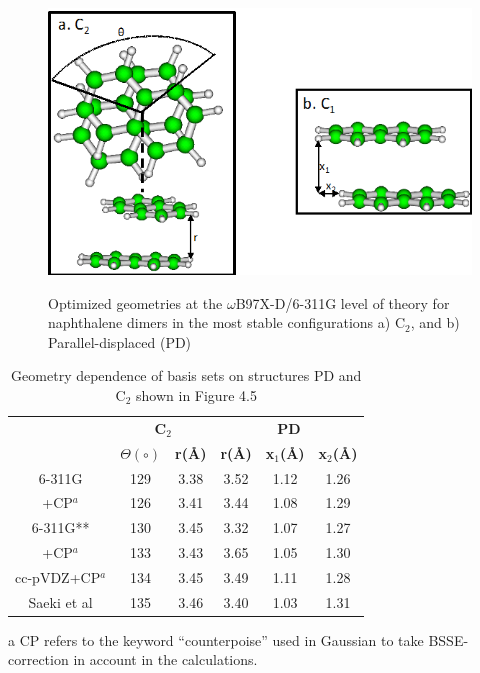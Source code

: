 \begin{figure}[h]
	\centering
	\includegraphics[scale=0.5]{image/napthalene-dimer}     \label{fig5d}
	\caption[Optimized geometries for naphthalene dimers]{Optimized geometries at the $\omega$B97X-D/6-311G level of theory for naphthalene dimers in the most stable configurations a) C$_{2}$, and b) Parallel-displaced (PD)}  
\end{figure}


\begin{table}[H]
	\caption{Geometry dependence of basis sets on structures PD and C$_{2}$ shown in Figure 4.5}
	\begin{center}
		\begin{threeparttable}[b]
		\begin{tabular}{c c c c c c}
			\toprule
			 & \multicolumn{2}{p{4cm}}{\centering \textbf{C$_{2}$}} & \multicolumn{3}{p{6cm}}{\centering \textbf{PD}}\\
			  & \textbf{$\Theta(\circ)$} & \textbf{r(\AA)} & \textbf{r(\AA)} & \textbf{x$_{1}$(\AA)} & \textbf{x$_{2}$(\AA)}\\
			  \midrule
			  6-311G & 129 & 3.38 & 3.52 & 1.12 & 1.26\\
			  +CP$^{a}$ & 126  & 3.41 & 3.44 & 1.08 & 1.29\\	  
			  6-311G** & 130 & 3.45 & 3.32 & 1.07 & 1.27\\
			  +CP$^{a}$ & 133 & 3.43 & 3.65 & 1.05 & 1.30\\
			  cc-pVDZ+CP$^{a}$ & 134 & 3.45 & 3.49 & 1.11 & 1.28\\
			  Saeki et al\cite{saeki2006theoretical} & 135 & 3.46 & 3.40 & 1.03 &  1.31\\
			  \bottomrule
		\end{tabular}
		
		\begin{tablenotes}
			\item[a] CP refers to the keyword “counterpoise” used in Gaussian to take BSSE-correction in account in the calculations.
		\end{tablenotes}
	\end{threeparttable}
	\end{center}
	\label{table5}
\end{table}


